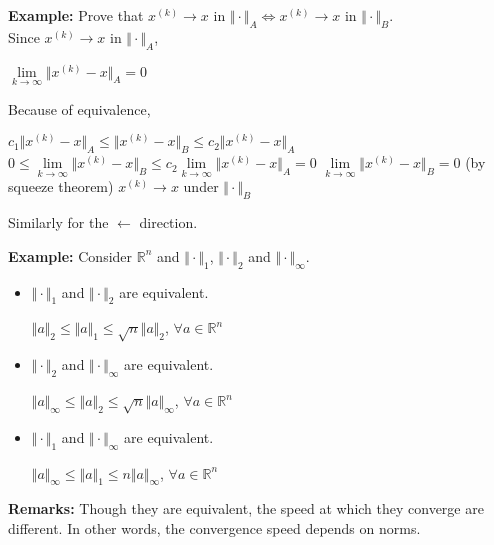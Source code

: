 \documentclass{article}
\begin{document}
\textbf{Example:} Prove that $x^{(k)} \to x$ in $\Vert \cdot \Vert_A \iff x^{(k)} \to x$ in $\Vert \cdot \Vert_B$. \\
    Since $x^{(k)} \to x$ in $\Vert \cdot \Vert_A$, \\
    \begin{center}
            $\underset{k \to \infty}{\lim} \Vert x ^ {(k)} - x \Vert_A = 0 $ \\
            \raggedright Because of equivalence, \\
            \begin{center}
                $c_1 \Vert x^{(k)} - x \Vert_A \leq \Vert x^{(k)} - x \Vert_B \leq c_2 \Vert x^{(k)} - x \Vert_A $ \bigbreak
                $0 \leq \underset{k \to \infty}{\lim}\Vert x^{(k)} - x \Vert_B \leq c_2 \underset{k \to \infty}{\lim}\Vert  x^{(k)} - x \Vert_A = 0$ \bigbreak
                $\underset{k \to \infty}{\lim} \Vert x^{(k)} - x \Vert_B = 0$ (by squeeze theorem) \bigbreak
                $x^{(k)} \to x$ under $\Vert \cdot \Vert_B$
            \end{center}
    Similarly for the $\leftarrow$ direction.
    \end{center}

\textbf{Example:} Consider $\mathbb{R}^{n}$ and $\Vert \cdot \Vert_1$, $\Vert \cdot \Vert_2$ and $\Vert \cdot \Vert_\infty$.  \\
\begin{itemize}
    \item $\Vert \cdot \Vert_1$ and $\Vert \cdot \Vert_2$ are equivalent. \\
        \begin{center}
            $\Vert a \Vert_2 \leq \Vert a \Vert_1 \leq \sqrt{n}\Vert a \Vert_2$, $\forall a \in \mathbb{R}^{n}$
        \end{center}
    \item $\Vert \cdot \Vert_2$ and $\Vert \cdot \Vert_\infty$ are equivalent.
        \begin{center}
            $\Vert a \Vert_\infty \leq \Vert a \Vert_2 \leq \sqrt{n}\Vert a \Vert_\infty$, $\forall a \in \mathbb{R}^{n}$
        \end{center}
    \item $\Vert \cdot \Vert_1$ and $\Vert \cdot \Vert_\infty$ are equivalent.
        \begin{center}
            $\Vert a \Vert_\infty \leq \Vert a \Vert_1 \leq n \Vert a \Vert_\infty$, $\forall a \in \mathbb{R}^{n}$
        \end{center}
\end{itemize}
\textbf{Remarks:} Though they are equivalent, the speed at which they converge are different. In other words, the convergence speed depends on norms. 
\end{document}
